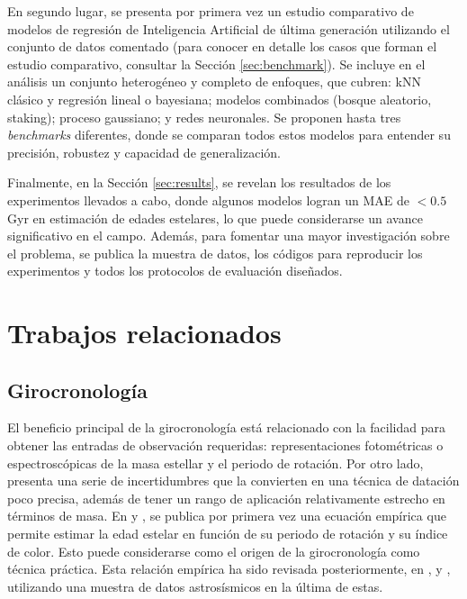 En segundo lugar, se presenta por primera vez un estudio comparativo de modelos de regresión de Inteligencia Artificial de última generación utilizando el conjunto de datos comentado (para conocer en detalle los casos que forman el estudio comparativo, consultar la Sección \ref{sec:benchmark}). Se incluye en el análisis un conjunto heterogéneo y completo de enfoques, que cubren: kNN clásico y regresión lineal o bayesiana; modelos combinados (bosque aleatorio, staking); proceso gaussiano; y redes neuronales. Se proponen hasta tres \emph{benchmarks} diferentes, donde se comparan todos estos modelos para entender su precisión, robustez y capacidad de generalización.

Finalmente, en la Sección \ref{sec:results}, se revelan los resultados de los experimentos llevados a cabo, donde algunos modelos logran un MAE de $<0.5$ Gyr en estimación de edades estelares, lo que puede considerarse un avance significativo en el campo. Además, para fomentar una mayor investigación sobre el problema, se publica la muestra de datos, los códigos para reproducir los experimentos y todos los protocolos de evaluación diseñados. 

 

\chapter{Trabajos relacionados} 
\label{sec:related_work}

\section{Girocronología}
El beneficio principal de la girocronología está relacionado con la facilidad para obtener las entradas de observación requeridas: representaciones fotométricas o espectroscópicas de la masa estellar y el periodo de rotación. Por otro lado, presenta una serie de incertidumbres que la convierten en una técnica de datación poco precisa, además de tener un rango de aplicación relativamente estrecho en términos de masa. En \cite{Barnes03} y \cite{Barnes07}, se publica por primera vez una ecuación empírica que permite estimar la edad estelar en función de su periodo de rotación y su índice de color. Esto puede considerarse como el origen de la girocronología como técnica práctica. Esta relación empírica ha sido revisada posteriormente, en \cite{MH}, \cite{Barnes10} y \cite{Angus15}, utilizando una muestra de datos astrosísmicos en la última de estas. 

